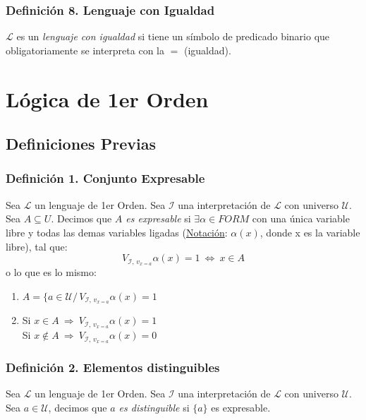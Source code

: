 \documentclass{article}
\newcommand{\comma}{,\,}                                %
\newcommand{\tq}{/\,}                                   %
\newcommand{\lenguaje}{\mathcal{L}}
\newcommand{\interpretacion}{\mathcal{I}}
\newcommand{\universo}{\mathcal{U}}
\newcommand{\Rightarrows}{\: \Rightarrow \:}            %
\newcommand{\Leftrightarrows}{\: \Leftrightarrow \:}    %
\begin{document}
\subsubsection*{Definición 8. Lenguaje con Igualdad}
$\lenguaje$ es un \emph{lenguaje con igualdad} si tiene un símbolo de predicado binario que obligatoriamente se interpreta con la $=$ (igualdad).

\newpage
\section{Lógica de 1er Orden}
\subsection{Definiciones Previas}
\subsubsection*{Definición 1. Conjunto Expresable}
Sea $\lenguaje$ un lenguaje de 1er Orden. Sea $\interpretacion$ una interpretación de $\lenguaje$ con universo $\universo$. 
\\Sea $A \subseteq U$. Decimos que \emph{$A$ es expresable} si $\exists \alpha \in FORM$ con una única variable libre y todas las demas variables ligadas (\underline{Notación}: $\alpha(x)$, donde x es la variable libre), tal que:
\begin{equation*}
    V_{\interpretacion \comma v_{x=a}} \alpha(x) = 1 \Leftrightarrows x \in A 
\end{equation*}
o lo que es lo mismo:
\begin{enumerate}
    \item $A = \{ a \in \universo \tq  V_{\interpretacion \comma v_{x=a}} \alpha(x) = 1$
    \item Si $x \in A \Rightarrows  V_{\interpretacion \comma v_{x=a}} \alpha(x) = 1 $ 
        \\Si $x \notin A \Rightarrows V_{\interpretacion \comma v_{x=a}} \alpha(x) = 0$
\end{enumerate}

\subsubsection*{Definición 2. Elementos distinguibles}
Sea $\lenguaje$ un lenguaje de 1er Orden. Sea $\interpretacion$ una interpretación de $\lenguaje$ con universo $\universo$.
\\Sea $a \in \universo$, decimos que \emph{$a$ es distinguible} si $\{a\}$ es expresable.
\end{document}
